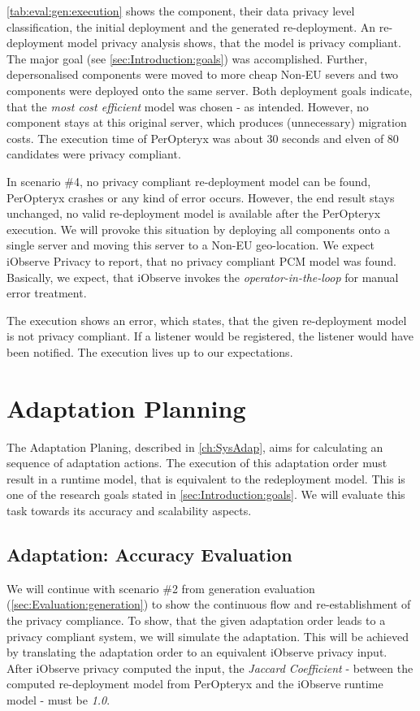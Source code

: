 \autoref{tab:eval:gen:execution} shows the component, their data privacy level classification, the initial deployment and the generated re-deployment. An re-deployment model privacy analysis shows, that the model is privacy compliant. The major goal (see \autoref{sec:Introduction:goals}) was accomplished. Further, depersonalised components were moved to more cheap Non-EU severs and two components were deployed onto the same server. Both deployment goals indicate, that the \textit{most cost efficient} model was chosen - as intended. However, no component stays at this original server, which produces (unnecessary) migration costs. The execution time of PerOpteryx was about 30 seconds and elven of 80 candidates were privacy compliant.

In scenario \#4, no privacy compliant re-deployment model can be found, PerOpteryx crashes or any kind of error occurs. However, the end result stays unchanged, no valid re-deployment model is available after the PerOpteryx execution. We will provoke this situation by deploying all components onto a single server and moving this server to a Non-EU geo-location. We expect iObserve Privacy to report, that no privacy compliant PCM model was found. Basically, we expect, that iObserve invokes the \textit{operator-in-the-loop} for manual error treatment.

The execution shows an error, which states, that the given re-deployment model is not privacy compliant. If a listener would be registered, the listener would have been notified. The execution lives up to our expectations. 

\section{Adaptation Planning}
\label{sec:Evaluation:planning}

The Adaptation Planing, described in \autoref{ch:SysAdap}, aims for calculating an sequence of adaptation actions. The execution of this adaptation order must result in a runtime model, that is equivalent to the redeployment model. This is one of the research goals stated in \autoref{sec:Introduction:goals}. We will evaluate this task towards its accuracy and scalability aspects.

 
\subsection{Adaptation: Accuracy Evaluation}

We will continue with scenario \#2 from generation evaluation (\autoref{sec:Evaluation:generation}) to show the continuous flow and re-establishment of the privacy compliance. To show, that the given adaptation order leads to a privacy compliant system, we will simulate the adaptation. This will be achieved by translating the adaptation order to an equivalent iObserve privacy input. After iObserve privacy computed the input, the \textit{Jaccard Coefficient} - between the computed re-deployment model from PerOpteryx and the iObserve runtime model - must be \textit{1.0}.

